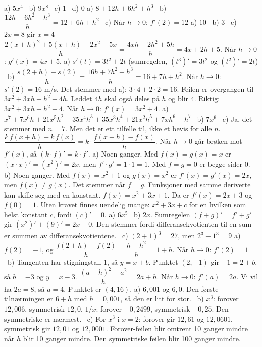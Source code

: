  a) $5x^4$ \ b) $9x^8$ \ c) $1$ \ d) $0$
 a) $8 + 12h + 6h^2 + h^3$ \ b) $\dfrac{12h + 6h^2 + h^3}{h} = 12 + 6h + h^2$ \ c) Når $h \to 0$: $f'(2) = 12$
 a) $10$ \ b) $3$ \ c) $2x = 8$ gir $x = 4$
 $\dfrac{2(x + h)^2 + 5(x + h) - 2x^2 - 5x}{h} = \dfrac{4xh + 2h^2 + 5h}{h} = 4x + 2h + 5$. Når $h \to 0$: $g'(x) = 4x + 5$.
 a) $s'(t) = 3t^2 + 2t$ (sumregelen, $(t^3)' = 3t^2$ og $(t^2)' = 2t$) \ b) $\dfrac{s(2 + h) - s(2)}{h} = \dfrac{16h + 7h^2 + h^3}{h} = 16 + 7h + h^2$. Når $h \to 0$: $s'(2) = 16$ m/s. Det stemmer med a): $3 \cdot 4 + 2 \cdot 2 = 16$.
 Feilen er overgangen til $3x^2 + 3xh + h^2 + 4h$. Leddet $4h$ skal også deles på $h$ og blir $4$. Riktig: $3x^2 + 3xh + h^2 + 4$. Når $h \to 0$: $f'(x) = 3x^2 + 4$.
 a) $x^7 + 7x^6h + 21x^5h^2 + 35x^4h^3 + 35x^3h^4 + 21x^2h^5 + 7xh^6 + h^7$ \ b) $7x^6$ \ c) Ja, det stemmer med $n = 7$. Men det er ett tilfelle til, ikke et bevis for alle $n$.
 $\dfrac{k\,f(x + h) - k\,f(x)}{h} = k \cdot \dfrac{f(x + h) - f(x)}{h}$. Når $h \to 0$ går brøken mot $f'(x)$, så $(k \cdot f)' = k \cdot f'$.
 a) Noen ganger. Med $f(x) = g(x) = x$ er $(x \cdot x)' = (x^2)' = 2x$, men $f' \cdot g' = 1 \cdot 1 = 1$. Med $f = g = 0$ er begge sider $0$.
b) Noen ganger. Med $f(x) = x^2 + 1$ og $g(x) = x^2$ er $f'(x) = g'(x) = 2x$, men $f(x) \neq g(x)$. Det stemmer når $f = g$. Funksjoner med samme deriverte kan skille seg med en konstant.
 $f(x) = x^2 + 3x + 1$. Da er $f'(x) = 2x + 3$ og $f(0) = 1$. Uten kravet finnes uendelig mange: $x^2 + 3x + c$ for en hvilken som helst konstant $c$, fordi $(c)' = 0$.
 a) $6x^5$ \ b) $2x$. Sumregelen $(f + g)' = f' + g'$ gir $(x^2)' + (9)' = 2x + 0$. Den stemmer fordi differansekvotienten til en sum er summen av differansekvotientene. \ c) $(2 + 1)^3 = 27$, men $2^3 + 1^3 = 9$
 a) $f(2) = -1$, og $\dfrac{f(2 + h) - f(2)}{h} = \dfrac{h + h^2}{h} = 1 + h$. Når $h \to 0$: $f'(2) = 1$ \ b) Tangenten har stigningstall $1$, så $y = x + b$. Punktet $(2, -1)$ gir $-1 = 2 + b$, så $b = -3$ og $y = x - 3$.
 $\dfrac{(a + h)^2 - a^2}{h} = 2a + h$. Når $h \to 0$: $f'(a) = 2a$. Vi vil ha $2a = 8$, så $a = 4$. Punktet er $(4, 16)$.
 a) $6,001$ og $6,0$. Den første tilnærmingen er $6 + h$ med $h = 0,001$, så den er litt for stor. \ b) $x^3$: forover $12,006$, symmetrisk $12,0$. $1/x$: forover $-0,2499$, symmetrisk $-0,25$. Den symmetriske er nærmest. \ c) For $x^3$ i $x = 2$: forover gir $12,61$ og $12,0601$, symmetrisk gir $12,01$ og $12,0001$. Forover-feilen blir omtrent 10 ganger mindre når $h$ blir 10 ganger mindre. Den symmetriske feilen blir 100 ganger mindre.
